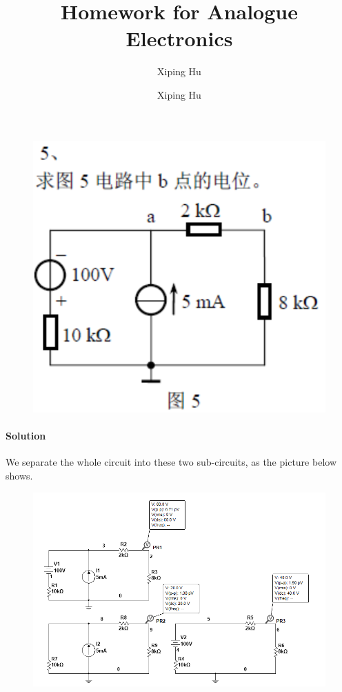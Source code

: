 \documentclass{article}
\author{Xiping Hu}
\author{Xiping Hu}
\affil{http://thehxp.tech/}
\title{Homework for Analogue Electronics}
\begin{document}
\maketitle

\begin{figure}[H]
  \centering
  \includegraphics[width=\linewidth]{figures/5}
  \label{fig:}
\end{figure}

\paragraph{Solution}

We separate the whole circuit into these two sub-circuits, as the picture below shows.

\begin{figure}[H]
  \centering
  \includegraphics[width=\linewidth]{figures/9}
  \label{fig:}
\end{figure}
\end{document}
